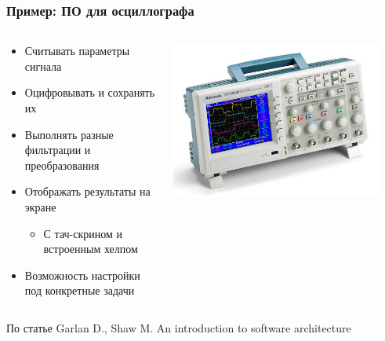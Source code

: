 \documentclass{../slides-style}
\begin{document}
    \begin{frame}
        \frametitle{Пример: ПО для осциллографа}
        \begin{columns}
            \begin{column}{0.6\textwidth}
                \begin{itemize}
                    \item Считывать параметры сигнала
                    \item Оцифровывать и сохранять их
                    \item Выполнять разные фильтрации и преобразования
                    \item Отображать результаты на экране
                    \begin{itemize}
                        \item С тач-скрином и встроенным хелпом
                    \end{itemize}
                    \item Возможность настройки под конкретные задачи
                \end{itemize}
            \end{column}
            \begin{column}{0.4\textwidth}
                \begin{center}
                    \includegraphics[width=0.9\textwidth]{oscilloscope.png}
                \end{center}
            \end{column}
        \end{columns}
        \vspace{1cm}
        \begin{tiny}
            По статье Garlan D., Shaw M. An introduction to software architecture
        \end{tiny}
    \end{frame}
\end{document}
